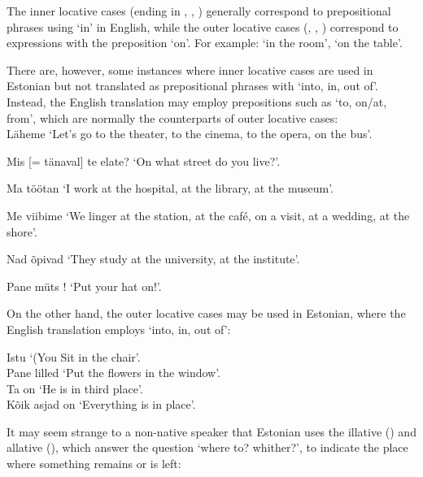 \newLesson %
\label{lesson-18}

\Grammar %


The inner locative cases (ending in , , ) generally correspond to prepositional phrases using `in' in English, while the outer locative cases (, , ) correspond to expressions with the preposition `on'. For example:  `in the room',  `on the table'.

\newSection \label{section-109} There are, however, some instances where inner locative cases are used in Estonian but not translated as prepositional phrases with `into, in, out of'. Instead, the English translation may employ prepositions such as `to, on/at, from', which are normally the counterparts of outer locative cases: \\

Läheme  `Let's go to the theater, to the cinema, to the opera, on the bus'.

Mis  [= tänaval] te elate? `On what street do you \pl live?'.

Ma töötan  `I work at the hospital, at the library, at the museum'.

Me viibime  `We linger at the station, at the café, on a visit, at a wedding, at the shore'.

Nad õpivad  `They study at the university, at the institute'.

Pane müts ! `Put your hat on!'.

\newSection \label{section-110} On the other hand, the outer locative cases may be used in Estonian, where the English translation employs `into, in, out of':

	\oneColumnTable
	Istu  `(You \sing Sit in the chair'. \\
	Pane lilled  `Put the flowers in the window'. \\
	Ta on  `He is in third place'. \\
	Kõik asjad on  `Everything is in place'.
	\tableEnd


\newSection \label{section-111} It may seem strange to a non-native speaker that Estonian uses the illative () and allative (), which answer the question `where to? whither?', to indicate the place where something remains or is left: \\

